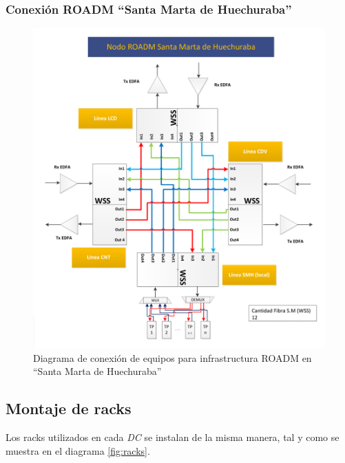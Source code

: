 \subsubsection{Conexión ROADM ``Santa Marta de Huechuraba''}
\label{sec:drsmh}

\begin{figure}[H]
  \centering
  \includegraphics[width=17cm]{Imagenes/SMH.pdf}
  \caption{Diagrama de conexión de equipos para infrastructura ROADM en ``Santa Marta de Huechuraba''}
  \label{fig:drsmh}
\end{figure}

\subsection{Montaje de racks}
\label{sec:racks}

Los racks utilizados en cada \emph{DC} se instalan de la misma manera,
tal y como se muestra en el diagrama \ref{fig:racks}.

